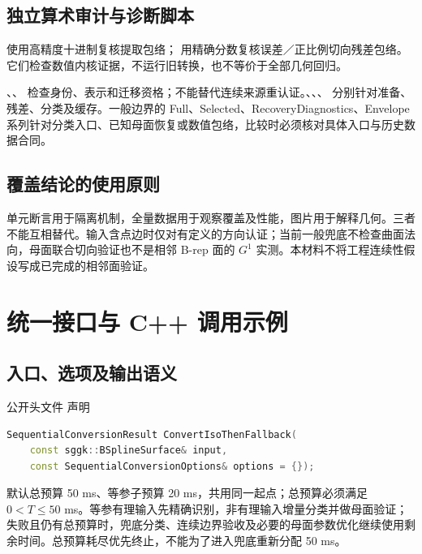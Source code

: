 \documentclass[UTF8,zihao=5,fontset=windows,a4paper]{ctexart}
\begin{document}
\subsection{独立算术审计与诊断脚本}
 使用高精度十进制复核提取包络； 用精确分数复核误差／正比例切向残差包络。它们检查数值内核证据，不运行旧转换，也不等价于全部几何回归。

、、 检查身份、表示和迁移资格；不能替代连续来源重认证。、、、 分别针对准备、残差、分类及缓存。一般边界的 Full、Selected、RecoveryDiagnostics、Envelope 系列针对分类入口、已知母面恢复或数值包络，比较时必须核对具体入口与历史数据合同。

\subsection{覆盖结论的使用原则}
单元断言用于隔离机制，全量数据用于观察覆盖及性能，图片用于解释几何。三者不能互相替代。输入含点边时仅对有定义的方向认证；当前一般兜底不检查曲面法向，母面联合切向验证也不是相邻 B-rep 面的 $G^1$ 实测。本材料不将工程连续性假设写成已完成的相邻面验证。

\newpage
\section{统一接口与 C++ 调用示例}
\subsection{入口、选项及输出语义}
公开头文件  声明
\begin{lstlisting}[language=C++]
SequentialConversionResult ConvertIsoThenFallback(
    const sggk::BSplineSurface& input,
    const SequentialConversionOptions& options = {});
\end{lstlisting}
默认总预算 50 ms、等参子预算 20 ms，共用同一起点；总预算必须满足 $0<T\le50$ ms。等参有理输入先精确识别，非有理输入增量分类并做母面验证；失败且仍有总预算时，兜底分类、连续边界验收及必要的母面参数优化继续使用剩余时间。总预算耗尽优先终止，不能为了进入兜底重新分配 50 ms。
\end{document}
